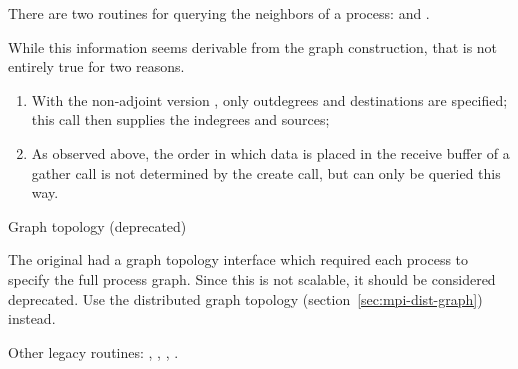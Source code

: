 There are two routines for querying the neighbors of a process:
%
and
.

While this information seems derivable from the graph construction,
that is not entirely true for two reasons.
\begin{enumerate}
\item With the non-adjoint version ,
  only outdegrees and destinations are specified; this call then supplies
  the indegrees and sources;
\item As observed above, the order in which data is placed in the
  receive buffer of a gather call is not determined by the create call,
  but can only be queried this way.
\end{enumerate}

 {Graph topology (deprecated)}
\label{sec:mpi-1-graph}

The original  had a graph topology interface
which required each process to specify the full process graph. Since
this is not scalable, it should be considered deprecated. Use the
distributed graph topology (section~\ref{sec:mpi-dist-graph}) instead.

Other legacy routines: 
,
,
,
.
